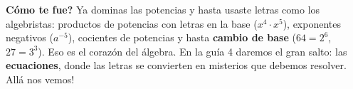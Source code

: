 \documentclass[12pt, letterpaper]{article}
\begin{document}
\vspace{10pt}
\begin{cuadrosolucion}
  \textbf{\textquestiondown Cómo te fue?} Ya dominas las potencias y hasta usaste letras como los algebristas: productos de potencias con letras en la base ($x^4 \cdot x^5$), exponentes negativos ($a^{-5}$), cocientes de potencias y hasta \textbf{cambio de base} ($64 = 2^6$, $27 = 3^3$). Eso es el corazón del álgebra. En la guía 4 daremos el gran salto: las \textbf{ecuaciones}, donde las letras se convierten en misterios que debemos resolver. \textquestiondown Allá nos vemos!
\end{cuadrosolucion}

\fi
\end{document}

